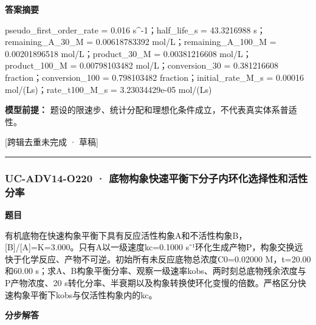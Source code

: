 \documentclass[UTF8,11pt,a4paper]{ctexart}
\begin{document}
\noindent\textbf{答案摘要}\par
pseudo\_first\_order\_rate = 0.016 s\textasciicircum{}-1；half\_life\_s = 43.3216988 s；remaining\_A\_30\_M = 0.00618783392 mol/L；remaining\_A\_100\_M = 0.00201896518 mol/L；product\_30\_M = 0.00381216608 mol/L；product\_100\_M = 0.00798103482 mol/L；conversion\_30 = 0.381216608 fraction；conversion\_100 = 0.798103482 fraction；initial\_rate\_M\_s = 0.00016 mol/(Ls)；rate\_t100\_M\_s = 3.23034429e-05 mol/(Ls)\par
\noindent\textbf{模型前提：}
题设的限速步、统计分配和理想化条件成立，不代表真实体系普适性。\par
\noindent\textcolor{red!65!black}{[跨辑去重未完成 · 草稿]} \par
\medskip\hrule\medskip
{}
\subsubsection*{UC-ADV14-O220 · 底物构象快速平衡下分子内环化选择性和活性分率}
\noindent\textbf{题目}\par
有机底物在快速构象平衡下具有反应活性构象A和不活性构象B，[B]/[A]=K=3.000。只有A以一级速度kc=0.1000 s⁻¹环化生成产物P，构象交换远快于化学反应、产物不可逆。初始所有未反应底物总浓度C0=0.02000 M，t=20.00和60.00 s；求A、B构象平衡分率、观察一级速率kobs、两时刻总底物残余浓度与P产物浓度、20 s转化分率、半衰期以及构象转换使环化变慢的倍数。严格区分快速构象平衡下kobs与仅活性构象内的kc。\par
\medskip\noindent\textbf{分步解答}
\end{document}
